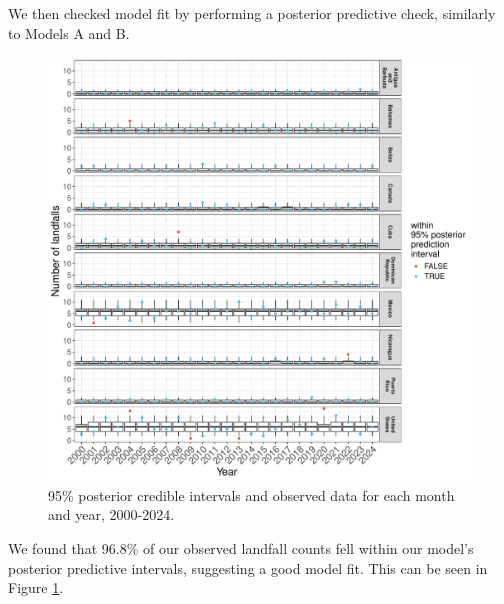 \documentclass[
]{article}
\begin{document}
We then checked model fit by performing a posterior predictive check, similarly to Models A and B.

\begin{figure}

{\centering \includegraphics[width=1\linewidth]{../outputs/bayesian-analysis-country-freq/country-post-pred-checks} 

}

\caption{95\% posterior credible intervals and observed data for each month and year, 2000-2024.}\label{fig:figs15}
\end{figure}

We found that 96.8\% of our observed landfall counts fell within our model's posterior predictive intervals, suggesting a good model fit. This can be seen in Figure \ref{fig:figs15}.
\end{document}
